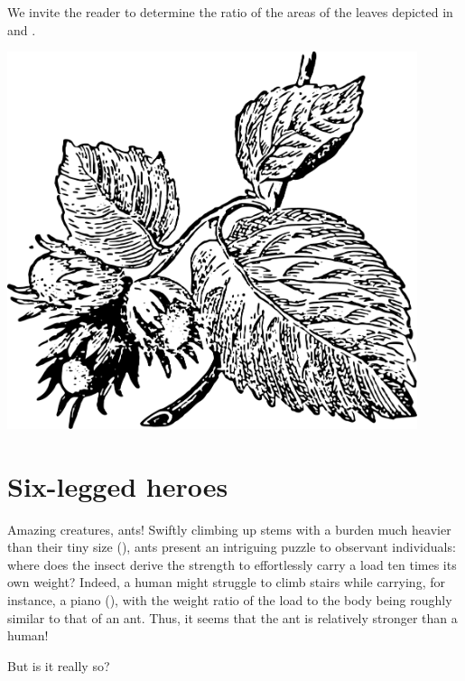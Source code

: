 \ques  We invite the reader to determine the ratio of the areas of the leaves depicted in  and .

\begin{marginfigure}[-4.5cm]%
\centering
\includegraphics[width=0.9\textwidth]{figures/ch-01/fig-01-23.pdf}
\end{marginfigure}



\section{Six-legged heroes}
\label{sec-1.14}

Amazing creatures, ants! Swiftly climbing up stems with a burden much heavier than their tiny size (), ants present an intriguing puzzle to observant individuals: where does the insect derive the strength to effortlessly carry a load ten times its own weight? Indeed, a human might struggle to climb stairs while carrying, for instance, a piano (), with the weight ratio of the load to the body being roughly similar to that of an ant. Thus, it seems that the ant is relatively stronger than a human!

But is it really so?

